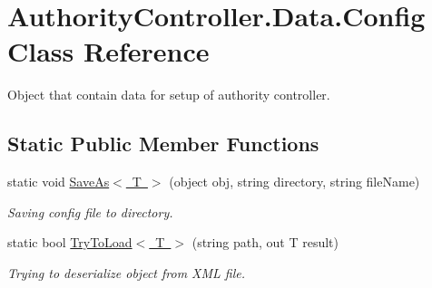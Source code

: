 \hypertarget{class_authority_controller_1_1_data_1_1_config}{}\section{Authority\+Controller.\+Data.\+Config Class Reference}
\label{class_authority_controller_1_1_data_1_1_config}


Object that contain data for setup of authority controller.  


\subsection*{Static Public Member Functions}
\begin{DoxyCompactItemize}
\item 
static void \mbox{\hyperlink{class_authority_controller_1_1_data_1_1_config_a96c731587b3eda94608691423dcc0d65}{Save\+As$<$ T $>$}} (object obj, string directory, string file\+Name)
\begin{DoxyCompactList}\small\item\em Saving config file to directory. \end{DoxyCompactList}\item 
static bool \mbox{\hyperlink{class_authority_controller_1_1_data_1_1_config_a71b175024423041ed094744021463342}{Try\+To\+Load$<$ T $>$}} (string path, out T result)
\begin{DoxyCompactList}\small\item\em Trying to deserialize object from X\+ML file. \end{DoxyCompactList}\end{DoxyCompactItemize}
